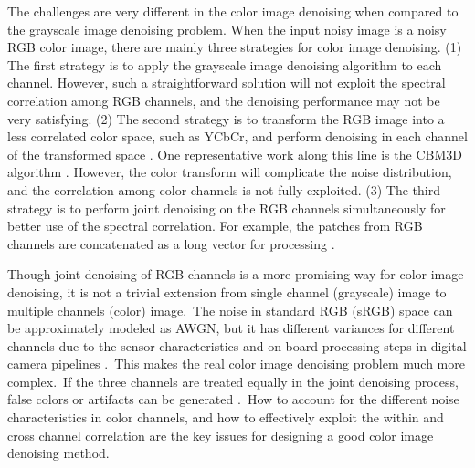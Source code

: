 The challenges are very different in the color image denoising when compared to the grayscale image denoising problem. When the input noisy image is a noisy RGB color image, there are mainly three strategies for color image denoising. (1) The first strategy is to apply the grayscale image denoising algorithm to each channel. However, such a straightforward solution will not exploit the spectral correlation among RGB channels, and the denoising performance may not be very satisfying. (2) The second strategy is to transform the RGB image into a less correlated color space, such as YCbCr, and perform denoising in each channel of the transformed space \cite{foe,cbm3d}. One representative work along this line is the CBM3D algorithm \cite{cbm3d}. However, the color transform will complicate the noise distribution, and the correlation among color channels is not fully exploited. (3) The third strategy is to perform joint denoising on the RGB channels simultaneously for better use of the spectral correlation. For example, the patches from RGB channels are concatenated as a long vector for processing \cite{mairal2008sparse,Zhu_2016_CVPR}.

Though joint denoising of RGB channels is a more promising way for color image denoising, it is not a trivial extension from single channel (grayscale) image to multiple channels (color) image.\ The noise in standard RGB (sRGB) space can be approximately modeled as AWGN, but it has different variances for different channels \cite{Liu2008,Leungtip,crosschannel2016} due to the sensor characteristics and on-board processing steps in digital camera pipelines \cite{crosschannel2016,karaimer_brown_ECCV_2016}.\ This makes the real color image denoising problem much more complex.\ If the three channels are treated equally in the joint denoising process, false colors or artifacts can be generated \cite{mairal2008sparse}.\ How to account for the different noise characteristics in color channels, and how to effectively exploit the within and cross channel correlation are the key issues for designing a good color image denoising method.

